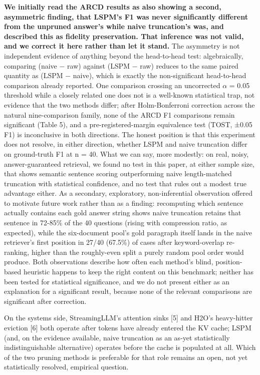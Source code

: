 \documentclass[pdflatex,sn-basic,Numbered]{sn-jnl}
\begin{document}
\textbf{We initially read the ARCD results as also showing a second, asymmetric finding, that LSPM's F1 was never significantly different from the unpruned answer's while naive truncation's was, and described this as fidelity preservation. That inference was not valid, and we correct it here rather than let it stand.} The asymmetry is not independent evidence of anything beyond the head-to-head test: algebraically, comparing (naive $-$ raw) against (LSPM $-$ raw) reduces to the same paired quantity as (LSPM $-$ naive), which is exactly the non-significant head-to-head comparison already reported. One comparison crossing an uncorrected $\alpha$ = 0.05 threshold while a closely related one does not is a well-known statistical trap, not evidence that the two methods differ; after Holm-Bonferroni correction across the natural nine-comparison family, none of the ARCD F1 comparisons remain significant (Table 5), and a pre-registered-margin equivalence test (TOST, ±0.05 F1) is inconclusive in both directions. The honest position is that this experiment does not resolve, in either direction, whether LSPM and naive truncation differ on ground-truth F1 at n = 40. What we can say, more modestly: on real, noisy, answer-guaranteed retrieval, we found no test in this paper, at either sample size, that shows semantic sentence scoring outperforming naive length-matched truncation with statistical confidence, and no test that rules out a modest true advantage either. As a secondary, exploratory, non-inferential observation offered to motivate future work rather than as a finding: recomputing which sentence actually contains each gold answer string shows naive truncation retains that sentence in 72-85\% of the 40 questions (rising with compression ratio, as expected), while the six-document pool's gold paragraph itself lands in the naive retriever's first position in 27/40 (67.5\%) of cases after keyword-overlap re-ranking, higher than the roughly-even split a purely random pool order would produce. Both observations describe how often each method's blind, position-based heuristic happens to keep the right content on this benchmark; neither has been tested for statistical significance, and we do not present either as an explanation for a significant result, because none of the relevant comparisons are significant after correction.

On the systems side, StreamingLLM's attention sinks [5] and H2O's heavy-hitter eviction [6] both operate after tokens have already entered the KV cache; LSPM (and, on the evidence available, naive truncation as an as-yet statistically indistinguishable alternative) operates before the cache is populated at all. Which of the two pruning methods is preferable for that role remains an open, not yet statistically resolved, empirical question.
\end{document}
